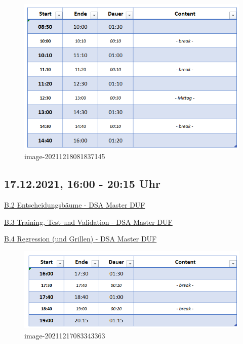 \documentclass[
]{book}
\theoremstyle{definition}
\theoremstyle{definition}
\theoremstyle{definition}
\theoremstyle{definition}
\theoremstyle{remark}
\begin{document}
\begin{figure}
\centering
\includegraphics{assets/README.assets/image-20211218081837145.png}
\caption{image-20211218081837145}
\end{figure}

\hypertarget{uhr-1}{%
\subsection*{17.12.2021, 16:00 - 20:15 Uhr}\label{uhr-1}}

\href{https://the-technology-lab.gitbook.io/dsml-master-duf/S0aldZCOg4S1HudPOP87/ml/0c_decision_trees}{B.2 Entscheidungsbäume - DSA Master DUF}

\href{https://the-technology-lab.gitbook.io/dsml-master-duf/S0aldZCOg4S1HudPOP87/ml/0c_train_test_val}{B.3 Training, Test und Validation - DSA Master DUF}

\href{https://the-technology-lab.gitbook.io/dsml-master-duf/S0aldZCOg4S1HudPOP87/ml/0c_regression}{B.4 Regression (und Grillen) - DSA Master DUF}

\begin{figure}
\centering
\includegraphics{assets/README.assets/image-20211217083343363.png}
\caption{image-20211217083343363}
\end{figure}
\end{document}
